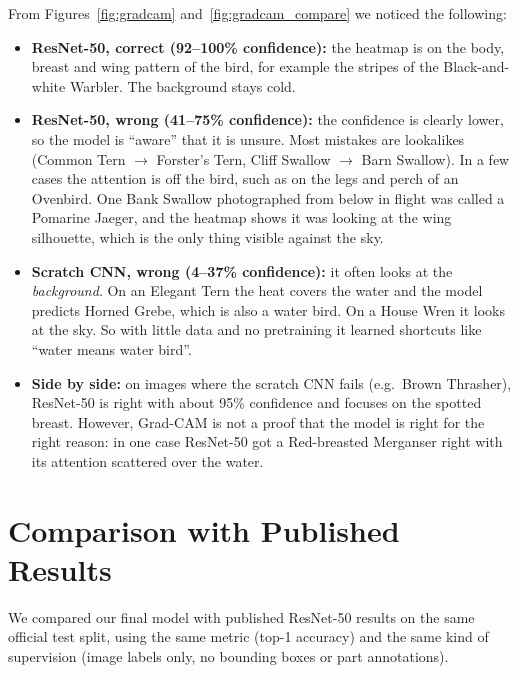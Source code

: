 \documentclass[11pt,a4paper]{article}
\begin{document}
From Figures~\ref{fig:gradcam} and~\ref{fig:gradcam_compare} we noticed the following:
\begin{itemize}
  \item \textbf{ResNet-50, correct (92--100\% confidence):} the heatmap is on the body, breast and wing pattern of the bird, for example the stripes of the Black-and-white Warbler. The background stays cold.
  \item \textbf{ResNet-50, wrong (41--75\% confidence):} the confidence is clearly lower, so the model is ``aware'' that it is unsure. Most mistakes are lookalikes (Common Tern $\to$ Forster's Tern, Cliff Swallow $\to$ Barn Swallow). In a few cases the attention is off the bird, such as on the legs and perch of an Ovenbird. One Bank Swallow photographed from below in flight was called a Pomarine Jaeger, and the heatmap shows it was looking at the wing silhouette, which is the only thing visible against the sky.
  \item \textbf{Scratch CNN, wrong (4--37\% confidence):} it often looks at the \emph{background}. On an Elegant Tern the heat covers the water and the model predicts Horned Grebe, which is also a water bird. On a House Wren it looks at the sky. So with little data and no pretraining it learned shortcuts like ``water means water bird''.
  \item \textbf{Side by side:} on images where the scratch CNN fails (e.g.\ Brown Thrasher), ResNet-50 is right with about 95\% confidence and focuses on the spotted breast. However, Grad-CAM is not a proof that the model is right for the right reason: in one case ResNet-50 got a Red-breasted Merganser right with its attention scattered over the water.
\end{itemize}

\section{Comparison with Published Results}

We compared our final model with published ResNet-50 results on the same official test split, using the same metric (top-1 accuracy) and the same kind of supervision (image labels only, no bounding boxes or part annotations).
\end{document}
